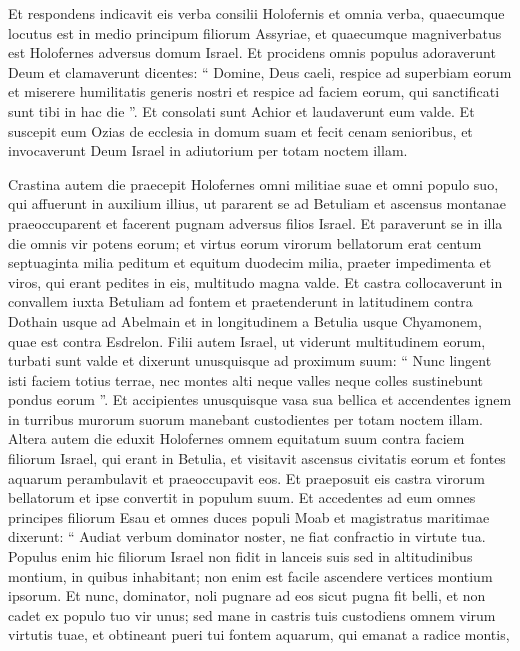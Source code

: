 \begin{biblechapter}
\begin{biblechapter}
\begin{biblechapter}
\begin{biblechapter}
\begin{biblechapter}
\begin{biblechapter}
\verse Et respondens indicavit eis verba consilii Holofernis et omnia verba, quaecumque locutus est in medio principum filiorum Assyriae, et quaecumque magniverbatus est Holofernes adversus domum Israel. 
 \verse Et procidens omnis populus adoraverunt Deum et clamaverunt dicentes: 
\verse “ Domine, Deus caeli, respice ad superbiam eorum et miserere humilitatis generis nostri et respice ad faciem eorum, qui sanctificati sunt tibi in hac die ”. 
 \verse Et consolati sunt Achior et laudaverunt eum valde. 
\verse Et suscepit eum Ozias de ecclesia in domum suam et fecit cenam senioribus, et invocaverunt
 Deum Israel in adiutorium per totam noctem illam. 
\begin{biblechapter}
\verse Crastina autem die praecepit Holofernes omni militiae suae et omni populo suo, qui affuerunt in auxilium illius, ut pararent se ad Betuliam et ascensus montanae praeoccuparent et facerent pugnam adversus filios Israel. 
\verse Et paraverunt se in illa die omnis vir potens eorum; et virtus eorum virorum bellatorum erat centum septuaginta milia peditum et equitum duodecim milia, praeter impedimenta et viros, qui erant pedites in eis, multitudo magna valde. 
 \verse Et castra collocaverunt in convallem iuxta Betuliam ad fontem et praetenderunt in latitudinem contra Dothain usque ad Abelmain et in longitudinem a Betulia usque Chyamonem, quae est contra Esdrelon. 
\verse Filii autem Israel, ut viderunt multitudinem eorum, turbati sunt valde et dixerunt unusquisque ad proximum suum: “ Nunc lingent isti faciem totius terrae, nec montes alti neque valles neque colles sustinebunt pondus eorum ”. 
\verse Et accipientes unusquisque vasa sua bellica et accendentes ignem in turribus murorum suorum manebant custodientes per totam noctem illam. 
\verse Altera autem die eduxit Holofernes omnem equitatum suum contra faciem filiorum Israel, qui erant in Betulia, 
\verse et visitavit ascensus civitatis eorum et fontes aquarum perambulavit et praeoccupavit eos. Et praeposuit eis castra virorum bellatorum et ipse convertit in populum suum. 
\verse Et accedentes ad eum omnes principes filiorum Esau et omnes duces populi Moab et magistratus maritimae dixerunt: 
\verse “ Audiat verbum dominator noster, ne fiat confractio in virtute tua. 
\verse Populus enim hic filiorum Israel non fidit in lanceis suis sed in altitudinibus montium, in quibus inhabitant; non enim est facile ascendere vertices montium ipsorum. 
\verse Et nunc, dominator, noli pugnare ad eos sicut pugna fit belli, et non cadet ex populo tuo vir unus; 
\verse sed mane in castris tuis custodiens omnem virum virtutis tuae, et obtineant pueri tui fontem aquarum, qui emanat a radice montis, 

\end{biblechapter}
\end{biblechapter}
\end{biblechapter}
\end{biblechapter}
\end{biblechapter}
\end{biblechapter}
\end{biblechapter}
